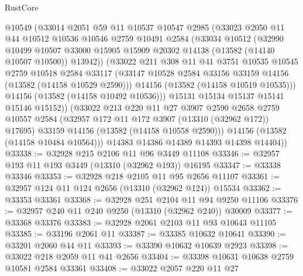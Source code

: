 \begin{lexlean}{RustCore}
\begin{coremodule}
            @10549
            (@33014
              @2051
              @59
              @11
              @10537
              @10547
              @2985
              (@33023
                @2050
                @11
                @44
                @10512
                @10536
                @10546
                @2759
                @10491
                @2584
                (@33034
                  @10512
                  (@32990
                    @10499
                    @10507
                    @33000
                    @15905
                    @15909
                    @20302
                    @14138
                    (@13582 (@14140 @10507 @10500))
                    @13942))
                (@33022
                  @211
                  @308
                  @11
                  @41
                  @3751
                  @10535
                  @10545
                  @2759
                  @10518
                  @2584
                  @33117
                  (@33147 @10528 @2584 @33156 @33159 @14156 (@13582 (@14158 @10529 @2590)))
                  @14156
                  (@13582 (@14158 @10519 @10535)))
                @14156
                (@13582 (@14158 @10492 @10536)))
              @15131
              @15134
              @15137
              @15141
              @15146
              @15152))
          (@33022
            @213
            @220
            @11
            @27
            @3907
            @2590
            @2658
            @2759
            @10557
            @2584
            (@32957 @172 @11 @172 @3907 (@13310 (@32962 @172)) @17695)
            @33159
            @14156
            (@13582 (@14158 @10558 @2590)))
          @14156
          (@13582 (@14158 @10484 @10564)))
        @14383
        @14386
        @14389
        @14393
        @14398
        @14404))
@33338 := @32928 @215 @2106 @11 @96 @3449 @11108
@33346 := @32957 @193 @11 @193 @3449 (@13310 (@32962 @193)) @16195
@33347 := @33338 @33346
@33353 := @32928 @218 @2105 @11 @95 @2656 @11107
@33361 := @32957 @124 @11 @124 @2656 (@13310 (@32962 @124)) @15534
@33362 := @33353 @33361
@33368 := @32928 @251 @2104 @11 @94 @9250 @11106
@33376 := @32957 @240 @11 @240 @9250 (@13310 (@32962 @240)) @30009
@33377 := @33368 @33376
@33383 := @32928 @2061 @2103 @11 @93 @10643 @11105
@33385 := @33196 @2061 @11
@33387 := @33385 @10632 @10641
@33390 := @33201 @2060 @44 @11
@33393 := @33390 @10632 @10639 @2923
@33398 := @33022 @218 @2059 @11 @41 @2656
@33404 := @33398 @10631 @10638 @2759 @10581 @2584 @33361
@33408 := @33022 @2057 @220 @11 @27

\end{coremodule}
\end{lexlean}

